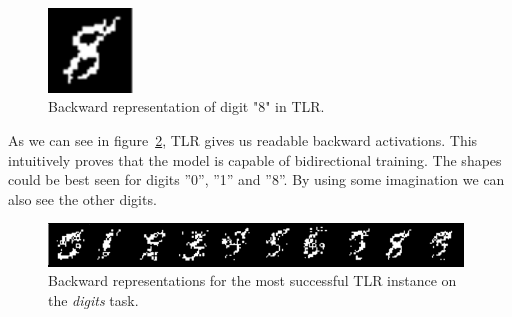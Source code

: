 \begin{figure}[H]
  \centering
  \includegraphics[width=0.2\textwidth]{img/tlr-digit-8.png} 
  \caption{Backward representation of digit "8" in TLR.}
  \label{fig:our-backward-repre-8}
\end{figure}

As we can see in figure~\ref{fig:results-tlr-digits-backward}, TLR gives us readable backward activations. This intuitively proves that the model is capable of bidirectional training. The shapes could be best seen for digits ''0'', ''1'' and ''8''. By using some imagination we can also see the other digits. 

\begin{figure}[H]
  \centering
  \includegraphics[width=0.98\textwidth]{img/tlr-digits.png}    
  \caption{Backward representations for the most successful TLR instance on the \emph{digits} task.}
  \label{fig:results-tlr-digits-backward} 
\end{figure}
